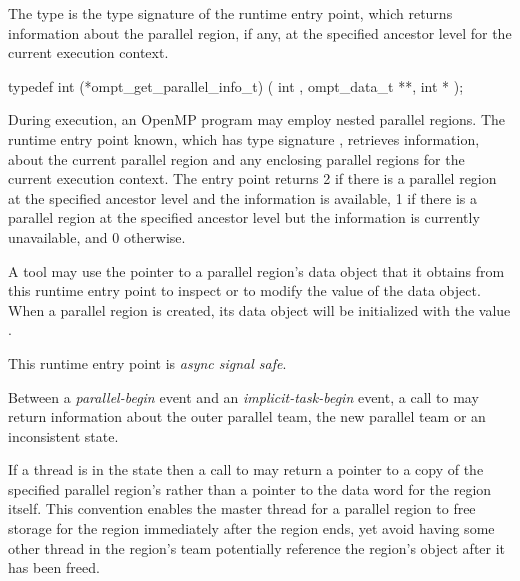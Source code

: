 \summary
The  type is the type signature of the 
 runtime entry point, which returns information 
about the parallel region, if any, at the specified ancestor level for 
the current execution context.

\format
\begin{ccppspecific}
\begin{omptInquiry}
typedef int (*ompt_get_parallel_info_t) (
  int ,
  ompt_data_t **,
  int *
);
\end{omptInquiry}
\end{ccppspecific}

\descr
During execution, an OpenMP program may employ nested parallel regions.
The  runtime entry point known, which has
type signature , retrieves information,
about the current parallel region and any enclosing parallel regions 
for the current execution context. The entry point returns 2 if there 
is a parallel region at the specified ancestor level and the information 
is available, 1 if there is a parallel region at the specified ancestor 
level but the information is currently unavailable, and 0 otherwise.

A tool may use the pointer to a parallel region's data object that it
obtains from this runtime entry point to inspect or to modify the value
of the data object. When a parallel region is created, its data
object will be initialized with the value .

This runtime entry point is \emph{async signal safe}.

Between a \emph{parallel-begin} event and an \emph{implicit-task-begin} event, 
a call to  may return information about 
the outer parallel team, the new parallel team or an inconsistent state.

If a thread is in the state 
then a call to  may return a pointer to a copy 
of the specified parallel region's  rather than a pointer 
to the data word for the region itself. This convention enables the master 
thread for a parallel region to free storage for the region immediately after 
the region ends, yet avoid having some other thread in the region's team potentially 
reference the region's  object after it has been freed.

